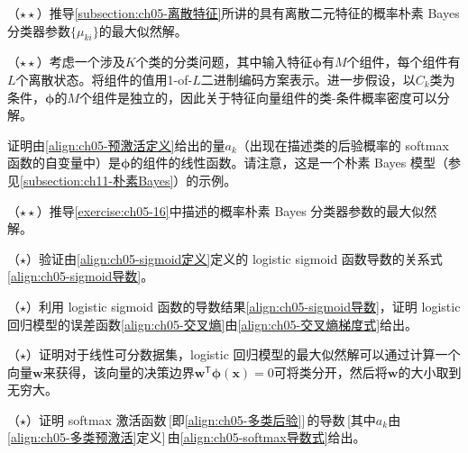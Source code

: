 \documentclass[../../main.tex]{subfiles}
\begin{document}
\begin{exercise}\label{exercise:ch05-15}
（$\star\star$）推导\cref{subsection:ch05-离散特征}所讲的具有离散二元特征的概率朴素 Bayes 分类器参数$\{\mu_{ki}\}$的最大似然解。
\end{exercise}

\begin{exercise}\label{exercise:ch05-16}
（$\star\star$）考虑一个涉及$K$个类的分类问题，其中输入特征$\boldsymbol{\phi}$有$M$个组件，每个组件有$L$个离散状态。将组件的值用1-of-$L$二进制编码方案表示。进一步假设，以$C_k$类为条件，$\boldsymbol{\phi}$的$M$个组件是独立的，因此关于特征向量组件的类-条件概率密度可以分解。

证明由\eqref{align:ch05-预激活定义}给出的量$a_k$（出现在描述类的后验概率的 softmax 函数的自变量中）是$\boldsymbol{\phi}$的组件的线性函数。请注意，这是一个朴素 Bayes 模型（参见\cref{subsection:ch11-朴素Bayes}）的示例。
\end{exercise}

\begin{exercise}\label{exercise:ch05-17}
（$\star\star$）推导\cref{exercise:ch05-16}中描述的概率朴素 Bayes 分类器参数的最大似然解。
\end{exercise}

\begin{exercise}\label{exercise:ch05-18}
（$\star$）验证由\eqref{align:ch05-sigmoid定义}定义的 logistic sigmoid 函数导数的关系式\eqref{align:ch05-sigmoid导数}。
\end{exercise}

\begin{exercise}\label{exercise:ch05-19}
（$\star$）利用 logistic sigmoid 函数的导数结果\eqref{align:ch05-sigmoid导数}，证明 logistic 回归模型的误差函数\eqref{align:ch05-交叉熵}由\eqref{align:ch05-交叉熵梯度式}给出。
\end{exercise}

\begin{exercise}\label{exercise:ch05-20}
（$\star$）证明对于线性可分数据集，logistic 回归模型的最大似然解可以通过计算一个向量$\boldsymbol{w}$来获得，该向量的决策边界$\boldsymbol{w}^{\mathsf{T}}\boldsymbol{\phi}(\boldsymbol{x})=0$可将类分开，然后将$\boldsymbol{w}$的大小取到无穷大。
\end{exercise}

\begin{exercise}\label{exercise:ch05-21}
（$\star$）证明 softmax 激活函数\,[即\eqref{align:ch05-多类后验}]\,的导数\,[其中$a_k$由\eqref{align:ch05-多类预激活}定义]\,由\eqref{align:ch05-softmax导数式}给出。
\end{exercise}
\end{document}
